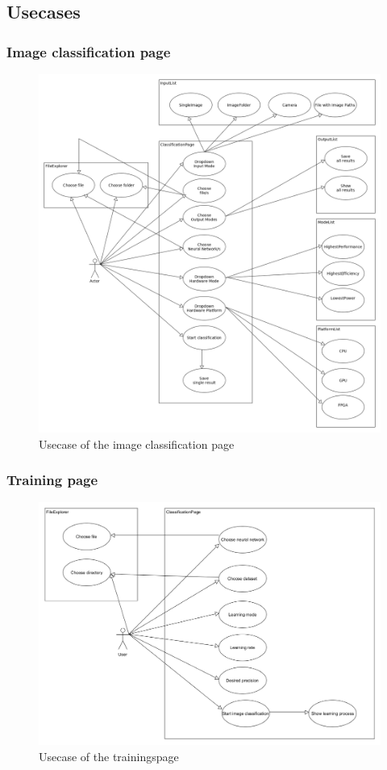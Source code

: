 \documentclass[parskip=full]{scrartcl}
\begin{document}
\subsection{Usecases}
\subsubsection{Image classification page}
\begin{figure}[htb!]
\centering
\includegraphics[width=\textwidth]{ClassificationUsecase}
\caption{Usecase of the \gls{image classification} page}
\end{figure}
\newpage
\subsubsection{Training page}
\begin{figure}[htb!]
\centering
\includegraphics[width=\textwidth]{TrainUsecase}
\caption{Usecase of the trainingspage}
\end{figure}
\clearpage
\end{document}
